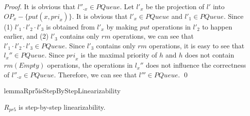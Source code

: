 \begin {proof}
It is obvious that $l''_{\textit{-x}} \in \textit{PQueue}$. Let $l'_x$ be the projection of $l'$ into $\textit{OP}_x - \{ \textit{put}(x,\textit{pri}_x) \}$. It is obvious that $l'_x \in \textit{PQueue}$ and $l'_1 \in \textit{PQueue}$. Since (1) $l'_1 \cdot l'_2 \cdot l'_3$ is obtained from $l'_x$ by making $\textit{put}$ operations in $l'_2$ to happen earlier, and (2) $l'_3$ contains only $\textit{rm}$ operations, we can see that $l'_1 \cdot l'_2 \cdot l'_3 \in \textit{PQueue}$. Since $l'_3$ contains only $\textit{rm}$ operations, it is easy to see that $l_x'' \in \textit{PQueue}$. Since $\textit{pri}_x$ is the maximal priority of $h$ and $h$ does not contain $\textit{rm}(\textit{Empty})$ operations, the operations in $l_x''$ does not influence the correctness of $l''_{\textit{-x}} \in \textit{PQueue}$. Therefore, we can see that $l''' \in \textit{PQueue}$. \qed
\end {proof}




\begin{restatable}{lemma}{Rpr5isStepByStepLinearizability}
\label{lemma:Rpr5 is step-by-step linearizability}

$R_{\textit{pr5}}$ is step-by-step linearizability.

\end{restatable}

